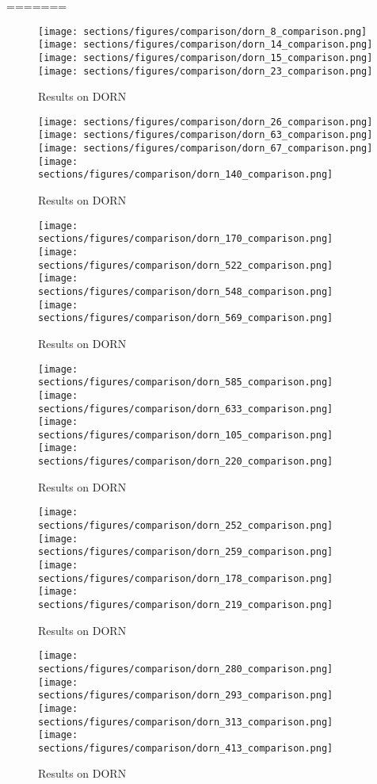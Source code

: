 =======
\begin{figure*}
  \texttt{[image: sections/figures/comparison/dorn\_8\_comparison.png]}
  \texttt{[image: sections/figures/comparison/dorn\_14\_comparison.png]}
  \texttt{[image: sections/figures/comparison/dorn\_15\_comparison.png]}
  \texttt{[image: sections/figures/comparison/dorn\_23\_comparison.png]}
  \caption{Results on DORN}
\end{figure*}
\begin{figure*}
  \texttt{[image: sections/figures/comparison/dorn\_26\_comparison.png]}
  \texttt{[image: sections/figures/comparison/dorn\_63\_comparison.png]}
  \texttt{[image: sections/figures/comparison/dorn\_67\_comparison.png]}
  \texttt{[image: sections/figures/comparison/dorn\_140\_comparison.png]}
  \caption{Results on DORN}
\end{figure*}
\begin{figure*}
  \texttt{[image: sections/figures/comparison/dorn\_170\_comparison.png]}
  \texttt{[image: sections/figures/comparison/dorn\_522\_comparison.png]}
  \texttt{[image: sections/figures/comparison/dorn\_548\_comparison.png]}
  \texttt{[image: sections/figures/comparison/dorn\_569\_comparison.png]}
  \caption{Results on DORN}
\end{figure*}
\begin{figure*}
  \texttt{[image: sections/figures/comparison/dorn\_585\_comparison.png]}
  \texttt{[image: sections/figures/comparison/dorn\_633\_comparison.png]}
  \texttt{[image: sections/figures/comparison/dorn\_105\_comparison.png]}
  \texttt{[image: sections/figures/comparison/dorn\_220\_comparison.png]}
  \caption{Results on DORN}
\end{figure*}
\begin{figure*}
  \texttt{[image: sections/figures/comparison/dorn\_252\_comparison.png]}
  \texttt{[image: sections/figures/comparison/dorn\_259\_comparison.png]}
  \texttt{[image: sections/figures/comparison/dorn\_178\_comparison.png]}
  \texttt{[image: sections/figures/comparison/dorn\_219\_comparison.png]}
  \caption{Results on DORN}
\end{figure*}
\begin{figure*}
  \texttt{[image: sections/figures/comparison/dorn\_280\_comparison.png]}
  \texttt{[image: sections/figures/comparison/dorn\_293\_comparison.png]}
  \texttt{[image: sections/figures/comparison/dorn\_313\_comparison.png]}
  \texttt{[image: sections/figures/comparison/dorn\_413\_comparison.png]}
  \caption{Results on DORN}
\end{figure*}
